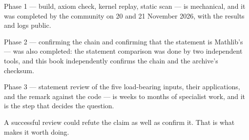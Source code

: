 \begin{keytakeaways}

\item Phase 1 --- build, axiom check, kernel replay, static scan --- is
mechanical, and it was completed by the community on 20 and 21 November 2026,
with the results and logs public.
\item Phase 2 --- confirming the chain and confirming that the statement is
Mathlib's --- was also completed: the statement comparison was done by two
independent tools, and this book independently confirms the chain and the
archive's checksum.
\item Phase 3 --- statement review of the five load-bearing inputs, their
applications, and the remark against the code --- is weeks to months of
specialist work, and it is the step that decides the question.
\item A successful review could refute the claim as well as confirm it. That
is what makes it worth doing.
\end{keytakeaways}
